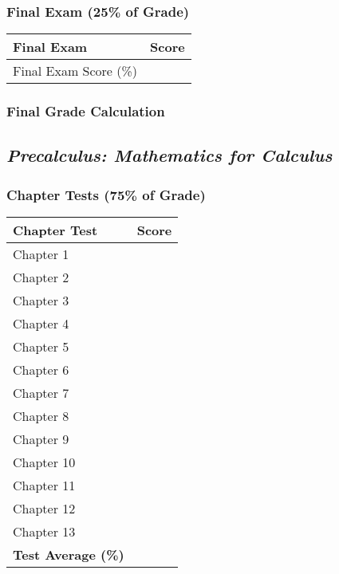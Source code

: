 \documentclass[11pt, letterpaper]{article}
\begin{document}
\subsubsection*{Final Exam (25\% of Grade)}
\begin{tabular}{|p{6cm}|p{3cm}|}
\hline
\textbf{Final Exam} & \textbf{Score} \\
\hline
Final Exam Score (\%) & \\
\hline
\end{tabular}

\subsubsection*{Final Grade Calculation}

\subsection*{\textit{Precalculus: Mathematics for Calculus}}
\subsubsection*{Chapter Tests (75\% of Grade)}
\begin{tabular}{|p{6cm}|p{3cm}|}
\hline
\textbf{Chapter Test} & \textbf{Score} \\
\hline
Chapter 1 & \\ \hline
Chapter 2 & \\ \hline
Chapter 3 & \\ \hline
Chapter 4 & \\ \hline
Chapter 5 & \\ \hline
Chapter 6 & \\ \hline
Chapter 7 & \\ \hline
Chapter 8 & \\ \hline
Chapter 9 & \\ \hline
Chapter 10 & \\ \hline
Chapter 11 & \\ \hline
Chapter 12 & \\ \hline
Chapter 13 & \\ \hline
\textbf{Test Average (\%)} & \\
\hline
\end{tabular}
\end{document}
